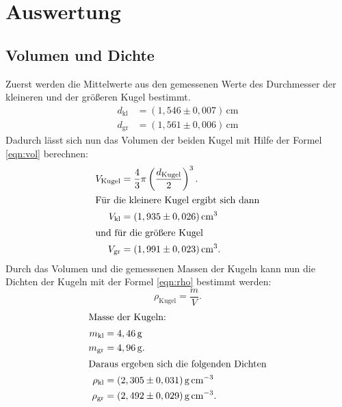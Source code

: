 \section{Auswertung}
\label{sec:Auswertung}
\subsection{Volumen und Dichte}
\label{sec:Vol und Dich}
Zuerst werden die Mittelwerte aus den gemessenen Werte des Durchmesser der kleineren und der größeren Kugel bestimmt.
\begin{align*}
d_\mathrm{kl}&=(1,546\pm0,007)\,\si{\centi\meter}\\
d_\mathrm{gr}&=(1,561\pm0,006)\,\si{\centi\meter}
\end{align*}
Dadurch lässt sich nun das Volumen der beiden Kugel mit Hilfe der Formel \eqref{eqn:vol}
berechnen:
\begin{align*}
V_{\mathrm{Kugel}}&=\frac{4}{3}\pi \left(\frac{d_{\mathrm{Kugel}}}{2}\right)^3\label{eqn:vol}.\\
\intertext{Für die kleinere Kugel ergibt sich dann}
V_{\mathrm{kl}}&=(1,935\pm0,026)\,\si{\cubic\centi\meter}\\
\intertext{und für die größere Kugel}
V_\mathrm{gr}&=(1,991\pm0,023)\,\si{\cubic\centi\meter}.
\end{align*}
Durch das Volumen und die gemessenen Massen der Kugeln kann nun die Dichten der Kugeln mit der Formel \eqref{eqn:rho}
bestimmt werden:
\begin{equation}
 \rho_{\mathrm{Kugel}}=\frac{m}{V}\label{eqn:rho}.
\end{equation}
\begin{align*}
\intertext{Masse der Kugeln:}
m_{\mathrm{kl}}&=4,46\,\si{\gram}\\
m_{\mathrm{gr}}&=4,96\,\si{\gram}.\\
\intertext{Daraus ergeben sich die folgenden Dichten}
\rho_{\mathrm{kl}}&=(2,305\pm0,031)\,\si{\gram\per\cubic\centi\meter}\\
\rho_{\mathrm{gr}}&=(2,492\pm0,029)\,\si{\gram\per\cubic\centi\meter}.
\end{align*}
